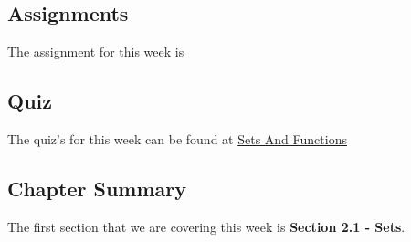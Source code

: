 \subsection{Assignments}

The assignment for this week is   

\subsection{Quiz}

The quiz's for this week can be found at \href{https://applied.cs.colorado.edu/mod/quiz/view.php?id=51619}{Sets And Functions}  

\subsection{Chapter Summary}

The first section that we are covering this week is \textbf{Section 2.1 - Sets}.

